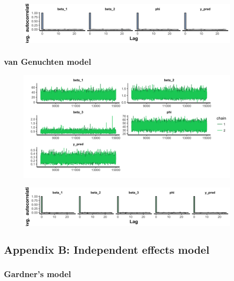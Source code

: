 \documentclass{article}
\begin{document}
\begin{figure}[ht!]
\centering
\includegraphics[width=16cm]{pooled_2pars_ac.png}
\end{figure}

\subsubsection*{van Genuchten model}

\begin{figure}[ht!]
\centering
\includegraphics[width=16cm, height = 5 cm]{pooled_3pars_trace.png}
\end{figure}

\begin{figure}[ht!]
\centering
\includegraphics[width=16cm]{pooled_3pars_ac.png}
\end{figure}

\subsection*{Appendix B: Independent effects model}
\subsubsection*{\textbf{Gardner's model}}
\end{document}
